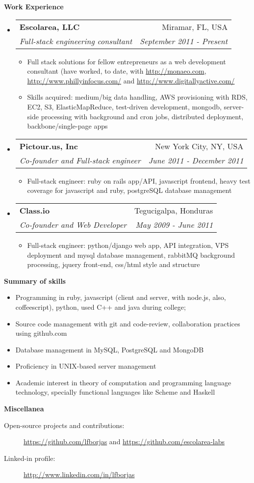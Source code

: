 \documentclass[letterpaper,10pt]{article}
\makeatletter
\newcommand{\resitem}[1]{\item #1 \vspace{-2pt}}
\newcommand{\resheading}[1]{{\large \colorbox{mygrey}{\begin{minipage}{\textwidth}{\textbf{#1 \vphantom{p\^{E}}}}\end{minipage}}}}
\newcommand{\ressubheading}[4]{
\begin{tabular*}{7.0in}{l@{\extracolsep{\fill}}r}
		\textbf{#1} & #2 \\
		\textit{#3} & \textit{#4} \\
\end{tabular*}\vspace{-6pt}}
\makeatother
\begin{document}
\resheading{Work Experience}
\begin{itemize}
\item
	\ressubheading{Escolarea, LLC}{Miramar, FL, USA}{Full-stack engineering consultant}{September 2011 - Present}
	\begin{itemize}
		\resitem{Full stack solutions for fellow entrepreneurs as a web development consultant (have worked, to date, with \url{http://monaeo.com}, \url{http://www.phillyinfocus.com/} and \url{http://www.digitallyactive.com/}}
    \resitem{Skills acquired: medium/big data handling, AWS provisioning with RDS, EC2, S3, ElasticMapReduce, test-driven development, mongodb, server-side processing with background and cron jobs, distributed deployment, backbone/single-page apps}
	\end{itemize}
\item
	\ressubheading{Pictour.us, Inc}{New York City, NY, USA}{Co-founder and Full-stack engineer}{June 2011 - December 2011}
	\begin{itemize}
		\resitem{Full-stack engineer: ruby on rails app/API, javascript frontend, heavy test coverage for javascript and ruby, postgreSQL database management}
	\end{itemize}
\item
	\ressubheading{Class.io}{Tegucigalpa, Honduras}{Co-founder and Web Developer}{May 2009 - June 2011}
	\begin{itemize}
		\resitem{Full-stack engineer: python/django web app, API integration, VPS deployment and mysql database management, rabbitMQ background processing, jquery front-end, css/html style and structure}
	\end{itemize}
\end{itemize}

\pagebreak


\resheading{Summary of skills}
\begin{itemize}
  \item{
    Programming in ruby, 
    javascript (client and server, with node.js, also, coffeescript),
    python,
     used C++ and java during college;
  }
  \item{Source code management with git and code-review, collaboration practices using github.com}
  \item{Database management in MySQL, PostgreSQL and MongoDB}
  \item{Proficiency in UNIX-based server management}
  \item{Academic interest in theory of computation and programming language technology, specially functional languages like Scheme and Haskell}
\end{itemize}

\resheading{Miscellanea}
\begin{description}
\item[Open-source projects and contributions:]
 \url{https://github.com/lfborjas} and \url{https://github.com/escolarea-labs}
\item[Linked-in profile:]
 \url{http://www.linkedin.com/in/lfborjas}
\end{description}
\end{document}

